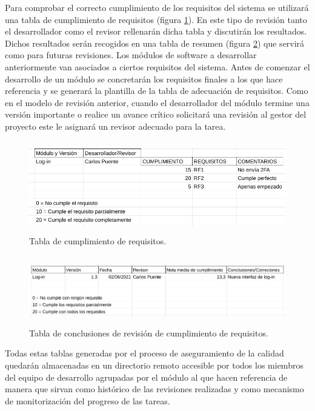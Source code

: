\documentclass{article}
\begin{document}
Para comprobar el correcto cumplimiento de los requisitos del sistema se utilizará una tabla de cumplimiento de requisitos (figura \ref{tablaRequisitos}). En este tipo de revisión tanto el desarrollador como el revisor rellenarán dicha tabla y discutirán los resultados. Dichos resultados serán recogidos en una tabla de resumen (figura \ref{tablaConclusionesRequisitos}) que servirá como para futuras revisiones. Los módulos de software a desarrollar anteriormente van asociados a ciertos requisitos del sistema. Antes de comenzar el desarrollo de un módulo se concretarán los requisitos finales a los que hace referencia y se generará la plantilla de la tabla de adecuación de requisitos. Como en el modelo de revisión anterior, cuando el desarrollador del módulo termine una versión importante o realice un avance crítico solicitará una revisión al gestor del proyecto este le asignará un revisor adecuado para la tarea. 

\begin{figure}[H]
    \centering
        \includegraphics[height=4cm]{../images/tabla_cumplimiento_requisitos.png}
    \caption{Tabla de cumplimiento de requisitos.}
    \label{tablaRequisitos}
\end{figure}

\begin{figure}[H]
    \centering
        \includegraphics[height=3cm]{../images/tabla_conclusiones_revision_requisitos.png}
    \caption{Tabla de conclusiones de revisión de cumplimiento de requisitos.}
    \label{tablaConclusionesRequisitos}
\end{figure}

Todas estas tablas generadas por el proceso de aseguramiento de la calidad quedarán almacenadas en un directorio remoto accesible por todos los miembros del equipo de desarrollo agrupadas por el módulo al que hacen referencia de manera que sirvan como histórico de las revisiones realizadas y como mecanismo de monitorización del progreso de las tareas.
\end{document}
